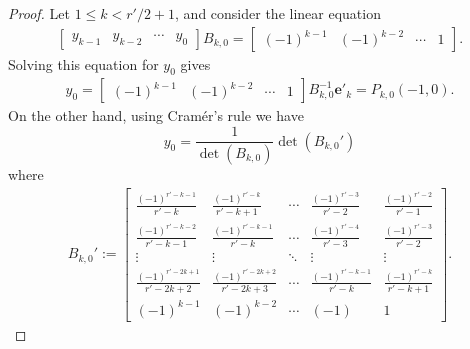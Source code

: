 \documentclass[11pt]{amsart}
\theoremstyle{definition}
\numberwithin{equation}{subsection}
\theoremstyle{plain}
\theoremstyle{plain}
\theoremstyle{plain}
\theoremstyle{plain}
\theoremstyle{plain}
\theoremstyle{plain}
\theoremstyle{plain}
\theoremstyle{plain}
\theoremstyle{plain}
\theoremstyle{plain}
\theoremstyle{plain}
\theoremstyle{plain}
\theoremstyle{definition}
\theoremstyle{definition}
\theoremstyle{definition}
\theoremstyle{remark}
\renewcommand{\(}{\textup{(}}
\renewcommand{\)}{\textup{)}}
\begin{document}
\begin{proof}
Let $1\leq k< r'/2+1$, and consider the linear equation
    \begin{align*}
        \begin{bmatrix}
            y_{k-1} & y_{k-2} & \cdots & y_0
        \end{bmatrix}
        B_{k,0}
        =
        \begin{bmatrix}
            (-1)^{k-1} & (-1)^{k-2} & \cdots & 1
        \end{bmatrix}.
    \end{align*}
Solving this equation for $y_0$ gives
    \begin{align*}
        y_0
        =
        \begin{bmatrix}
            (-1)^{k-1} & (-1)^{k-2} & \cdots & 1
        \end{bmatrix}
        B_{k,0}^{-1}
        \mathbf{e}'_{k}
        =P_{k,0}(-1,0).
    \end{align*}
On the other hand, using Cram\'er's rule we have
$$y_0=\frac{1}{\det(B_{k,0})}\det(B_{k,0}')$$
where
    \begin{align*}
        B_{k,0}':=
        \begin{bmatrix}
          \frac{(-1)^{r'-k-1}}{r'-k} & \frac{(-1)^{r'-k}}{r'-k+1} & \cdots & \frac{(-1)^{r'-3}}{r'-2} & \frac{(-1)^{r'-2}}{r'-1} \\
          \frac{(-1)^{r'-k-2}}{r'-k-1} & \frac{(-1)^{r'-k-1}}{r'-k} & \cdots & \frac{(-1)^{r'-4}}{r'-3} & \frac{(-1)^{r'-3}}{r'-2} \\
          \vdots & \vdots & \ddots & \vdots & \vdots \\
          \frac{(-1)^{r'-2k+1}}{r'-2k+2} & \frac{(-1)^{r'-2k+2}}{r'-2k+3} & \cdots & \frac{(-1)^{r'-k-1}}{r'-k} & \frac{(-1)^{r'-k}}{r'-k+1} \\
          (-1)^{k-1} & (-1)^{k-2} & \cdots & (-1) & 1
        \end{bmatrix}.
    \end{align*}


\end{proof}
\end{document}
